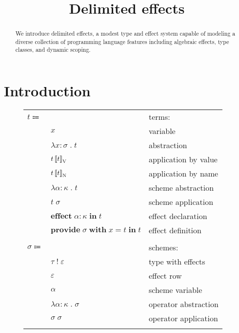 \documentclass[12pt]{article}
\title{Delimited effects}
\date{}
\newcommand\anno[2]{#1 : #2} %
\newcommand\term{t}
\newcommand\evar{x}
\newcommand\eabs[2]{\lambda #1 \; . \; #2} %
\newcommand\eappbv[2]{#1 \left\llbracket #2 \right\rrbracket_{\textsc{V}}} %
\newcommand\eappbn[2]{#1 \left\llbracket #2 \right\rrbracket_{\textsc{N}}} %
\newcommand\esabs[2]{\lambda #1 \; . \; #2} %
\newcommand\esapp[2]{#1 \; #2}
\newcommand\eeffect[3]{\textbf{effect} \; \anno{#1}{#2} \; \textbf{in} \; #3}
\newcommand\eprovide[4]{\textbf{provide} \; #1 \; \textbf{with} \; #2 = #3 \; \textbf{in} \; #4}
\newcommand\scheme{\sigma}
\newcommand\stwithx[2]{#1 \; ! \; #2} %
\newcommand\svar{\alpha}
\newcommand\sabs[2]{\lambda #1 \; . \; #2} %
\newcommand\sapp[2]{#1 \; #2} %
\newcommand\type{\tau}
\newcommand\row{\varepsilon}
\newcommand\kind{\kappa}
\begin{document}
  \maketitle

  \begin{abstract}
    We introduce delimited effects, a modest type and effect system capable of modeling a diverse collection of programming language features including algebraic effects, type classes, and dynamic scoping.
  \end{abstract}

  \section{Introduction}

  \begin{figure}
    \begin{mdframed}[backgroundcolor=none]
      \begin{center}
        \begin{tabular}{l l l}
          $\term \Coloneqq $ & & terms: \\
          & $\evar$ & variable \\
          & $\eabs{\anno{\evar}{\scheme}}{\term}$ & abstraction \\
          & $\eappbv{\term}{\term}$ & application by value \\
          & $\eappbn{\term}{\term}$ & application by name \\
          & $\esabs{\anno{\svar}{\kind}}{\term}$ & scheme abstraction \\
          & $\esapp{\term}{\scheme}$ & scheme application \\
          & $\eeffect{\svar}{\kind}{\term}$ & effect declaration \\
          & $\eprovide{\scheme}{\evar}{\term}{\term}$ & effect definition \\
          \\
          $\scheme \Coloneqq$ & & schemes: \\
          & $\stwithx{\type}{\row}$ & type with effects \\
          & $\row$ & effect row \\
          & $\svar$ & scheme variable \\
          & $\sabs{\anno{\svar}{\kind}}{\scheme}$ & operator abstraction \\
          & $\sapp{\scheme}{\scheme}$ & operator application \\
          \\

\end{tabular}
\end{center}
\end{mdframed}
\end{figure}
\end{document}
